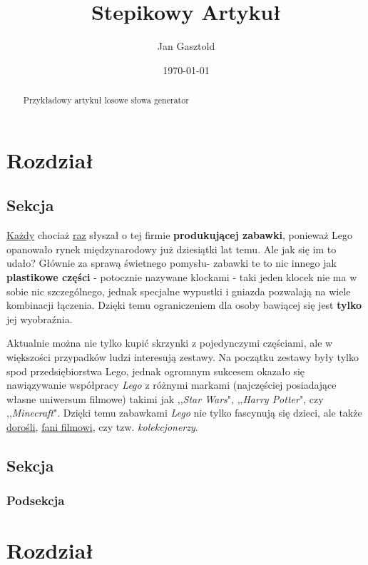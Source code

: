 \documentclass{article}
\title{Stepikowy Artykuł}
\author{Jan Gasztold}
\date{\today}
\begin{document}
\maketitle

\begin{abstract}
    Przykładowy artykuł losowe słowa generator
\end{abstract}

\section{Rozdział}

\subsection{Sekcja}

\underline{Każdy} chociaż \underline{raz} słyszał o tej firmie \textbf{produkującej zabawki}, ponieważ Lego opanowało rynek międzynarodowy już dziesiątki lat temu. Ale jak się im to udało? Głównie za sprawą świetnego pomysłu- zabawki te to nic innego jak \textbf{plastikowe części} - potocznie nazywane klockami - taki jeden klocek nie ma w sobie nic szczególnego, jednak specjalne wypustki i gniazda pozwalają na wiele kombinacji łączenia. Dzięki temu ograniczeniem dla osoby bawiącej się jest \textbf{tylko} jej wyobraźnia.

Aktualnie można nie tylko kupić skrzynki z pojedynczymi częściami, ale w większości przypadków ludzi interesują zestawy. Na początku zestawy były tylko spod przedsiębiorstwa Lego, jednak ogromnym sukcesem okazało się nawiązywanie współpracy \textit{Lego} z różnymi markami (najczęściej posiadające własne uniwersum filmowe) takimi jak ,,\textit{Star Wars}", ,,\textit{Harry Potter}", czy ,,\textit{Minecraft}". Dzięki temu zabawkami \textit{Lego} nie tylko fascynują się dzieci, ale także \underline{dorośli}, \underline{fani filmowi}, czy tzw. \textit{kolekcjonerzy}. \cite{autor1}

\subsection{Sekcja}

\lipsum[1]

\subsubsection{Podsekcja}

\lipsum[1]

\section{Rozdział}
\end{document}
